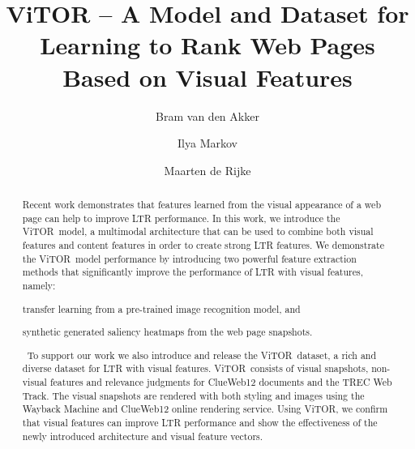\documentclass[sigconf,screen=true,anonymous]{acmart}
\title{ViTOR -- A Model and Dataset for Learning to Rank Web Pages Based on Visual Features}
\author{Bram van den Akker}
\affiliation{%
  \institution{University of Amsterdam}
  \city{Amsterdam} 
  \country{The Netherlands}
}
\author{Ilya Markov}
\affiliation{%
  \institution{University of Amsterdam}
  \city{Amsterdam} 
  \country{The Netherlands}  
}
\author{Maarten de Rijke}
\affiliation{%
   \institution{University of Amsterdam}
   \city{Amsterdam} 
   \country{The Netherlands}
}
\newcommand{\datasetname}{\ac{ViTOR}}
\newcommand{\modelname}{\ac{ViTOR}}
\begin{document}
%
%
\begin{abstract}
Recent work demonstrates that features learned from the visual appearance of a web page can help to improve \ac{LTR} performance. 
In this work, we introduce the \modelname~model, a multimodal architecture that can be used to combine both visual features and content features in order to create strong \ac{LTR} features. 
We demonstrate the \modelname~model performance by introducing two powerful feature extraction methods that significantly improve the performance of \ac{LTR} with visual features, namely: 
\begin{inparaenum}[(i)]
\item transfer learning from a pre-trained image recognition model, and
\item synthetic generated saliency heatmaps from the web page snapshots.
\end{inparaenum}\ 
To support our work we also introduce and release the \datasetname~dataset, a rich and diverse dataset for \ac{LTR} with visual features.
\datasetname~consists of visual snapshots, non-visual features and relevance judgments for ClueWeb12 documents and the TREC Web Track.
The visual snapshots are rendered with both styling and images using the Wayback Machine and ClueWeb12 online rendering service.
Using \datasetname, we confirm that visual features can improve \ac{LTR} performance
and show the effectiveness of the newly introduced architecture and visual feature vectors.
\end{abstract}

%
%
\end{document}
